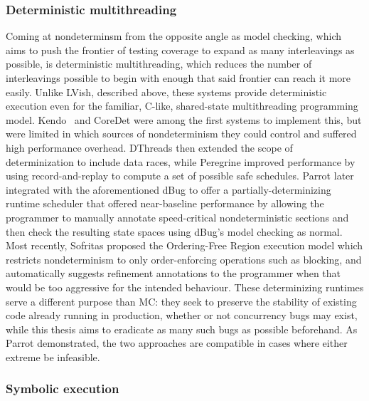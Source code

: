 \subsubsection{Deterministic multithreading}

Coming at nondeterminsm from the opposite angle as model checking,
which aims to push the frontier of testing coverage to expand as many interleavings as possible,
is deterministic multithreading,
which reduces the number of interleavings possible to begin with enough that said frontier can reach it more easily.
Unlike LVish, described above, these systems provide deterministic execution
even for the familiar, C-like, shared-state multithreading programming model.
Kendo~\cite{kendo} and CoreDet \cite{coredet} were among the first systems to implement this,
but were limited in which sources of nondeterminism they could control
and suffered high performance overhead.
DThreads \cite{dthreads} then extended the scope of determinization to include data races,
while Peregrine \cite{peregrine}
improved performance by using record-and-replay to compute a set of possible safe schedules.
%
Parrot \cite{parrot} later integrated with the aforementioned dBug \cite{dbug-ssv}
to offer a partially-determinizing runtime scheduler
that offered near-baseline performance by allowing the programmer to
manually annotate speed-critical nondeterministic sections
and then check the resulting state spaces using dBug's model checking as normal.
%
Most recently, Sofritas \cite{sofritas}
proposed the Ordering-Free Region execution model
which restricts nondeterminism to only order-enforcing operations such as blocking,
and automatically suggests refinement annotations to the programmer
when that would be too aggressive for the intended behaviour.
These determinizing runtimes serve a different purpose than MC:
they seek to preserve the stability of existing code already running in production,
whether or not concurrency bugs may exist,
while this thesis aims to eradicate as many such bugs as possible beforehand.
As Parrot demonstrated, the two approaches are compatible in cases where either extreme be infeasible.

\subsubsection{Symbolic execution}
\label{related:symbolic}

